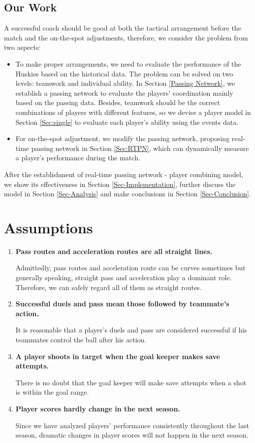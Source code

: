 \documentclass{mcmthesis}
\begin{document}
\subsection{Our Work}

A successful coach should be good at both the tactical arrangement before the match and the on-the-spot adjustments, therefore, we consider the problem from two aspects:
\begin{itemize}
  \item To make proper arrangements, we need to evaluate the performance of the Huskies based on the historical data. The problem can be solved on two levels: teamwork and individual ability. In Section \ref{Passing Network}, we establish a passing network to evaluate the players' coordination mainly based on the passing data. Besides, teamwork
      should be the correct combinations of players with different features, so we devise a player model in Section \ref{Sec:single} to evaluate each player's ability using the events data.
  \item For on-the-spot adjustment, we modify the passing network, proposing real-time passing network in Section \ref{Sec:RTPN}, which can dynamically measure a player's performance during the match.
\end{itemize}

After the establishment of real-time passing network - player combining model, we show its effectiveness in Section \ref{Sec-Implementation}, further discuss the model in Section \ref{Sec-Analysis} and make conclusions in Section \ref{Sec-Conclusion}.

\section{Assumptions}\label{Sec-Assume}
\begin{enumerate}
	\item \textbf{Pass routes and acceleration routes are all straight lines.}

Admittedly, pass routes and acceleration route can be curves sometimes but generally speaking, straight pass and acceleration play a dominant role. Therefore, we can safely regard all of them as straight routes.
	
\item \textbf{Successful duels and pass mean those followed by teammate's action.}

It is reasonable that a player's duels and pass are considered successful if his teammates control the ball after his action.

\item \textbf{A player shoots in target when the goal keeper makes save attempts.}

There is no doubt that the goal keeper will make save attempts when a shot is within the goal range.

\item \textbf{Player scores hardly change in the next season.}

Since we have analyzed players' performance consistently throughout the last season, dramatic changes in player scores will not happen in the next season.
	
\end{enumerate}
\end{document}
